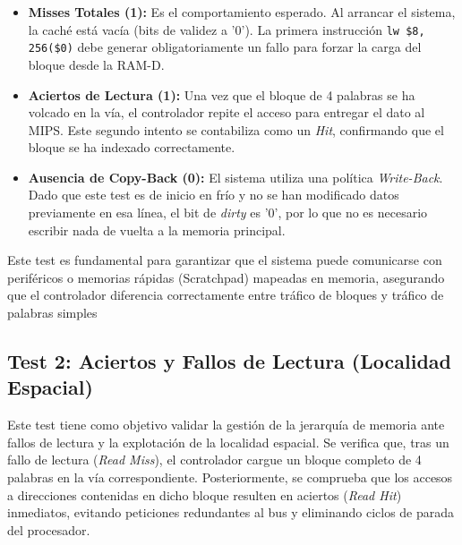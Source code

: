 \documentclass[12pt,a4paper]{article}
\begin{document}
\begin{itemize}
    \item \textbf{Misses Totales (1):} Es el comportamiento esperado. Al arrancar el sistema, la caché está vacía (bits de validez a '0'). La primera instrucción \texttt{lw \$8, 256(\$0)} debe generar obligatoriamente un fallo para forzar la carga del bloque desde la RAM-D.
    \item \textbf{Aciertos de Lectura (1):} Una vez que el bloque de 4 palabras se ha volcado en la vía, el controlador repite el acceso para entregar el dato al MIPS. Este segundo intento se contabiliza como un \textit{Hit}, confirmando que el bloque se ha indexado correctamente.
    \item \textbf{Ausencia de Copy-Back (0):} El sistema utiliza una política \textit{Write-Back}. Dado que este test es de inicio en frío y no se han modificado datos previamente en esa línea, el bit de \textit{dirty} es '0', por lo que no es necesario escribir nada de vuelta a la memoria principal.
\end{itemize}

\newpage

Este test es fundamental para garantizar que el sistema puede comunicarse con periféricos o memorias rápidas (Scratchpad) mapeadas en memoria, asegurando que el controlador diferencia correctamente entre tráfico de bloques y tráfico de palabras simples


\subsection{Test 2: Aciertos y Fallos de Lectura (Localidad Espacial)}

 Este test tiene como objetivo validar la gestión de la jerarquía de memoria ante fallos de lectura y la explotación de la localidad espacial. Se verifica que, tras un fallo de lectura (\textit{Read Miss}), el controlador cargue un bloque completo de 4 palabras en la vía correspondiente. Posteriormente, se comprueba que los accesos a direcciones contenidas en dicho bloque resulten en aciertos (\textit{Read Hit}) inmediatos, evitando peticiones redundantes al bus y eliminando ciclos de parada del procesador.
\end{document}
